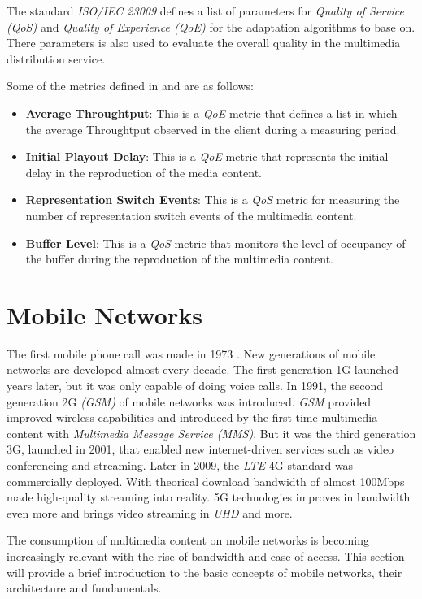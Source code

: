 The standard \textit{ISO/IEC 23009} defines a list of parameters for \textit{Quality of Service (QoS)} and
\textit{Quality of Experience (QoE)} for the adaptation algorithms to base on. There parameters 
is also used to evaluate the overall quality in the multimedia distribution service.

Some of the metrics defined in \cite{3gpp1} and \cite{ISO23009} are as follows:

\begin{itemize}
  \item \textbf{Average Throughtput}: This is a \textit{QoE} metric that defines a list in which 
  the average Throughtput observed in the client during a measuring period.
  \item \textbf{Initial Playout Delay}: This is a \textit{QoE} metric that represents the initial 
  delay in the reproduction of the media content.
  \item \textbf{Representation Switch Events}: This is a \textit{QoS} metric for measuring the 
  number of representation switch events of the multimedia content.
  \item \textbf{Buffer Level}: This is a \textit{QoS} metric that monitors the level of occupancy
  of the buffer during the reproduction of the multimedia content.
\end{itemize}


\section{Mobile Networks}
\label{sec:mobile}

The first mobile phone call was made in 1973 \cite{mob1}. New generations of mobile networks 
are developed almost every decade. The first generation 1G launched years later, but
it was only capable of doing voice calls. In 1991, the second generation 2G \textit{(GSM)} of 
mobile networks was introduced. \textit{GSM} provided improved wireless capabilities and 
introduced by the first time multimedia content with \textit{Multimedia Message Service (MMS)}.
But it was the third generation 3G, launched in 2001, that enabled new internet-driven
services such as video conferencing and streaming. Later in 2009, the \textit{LTE} 4G standard
was commercially deployed. With theorical download bandwidth of almost 100Mbps made high-quality
streaming into reality. 5G technologies improves in bandwidth even more and brings 
video streaming in \textit{UHD} and more.

The consumption of multimedia content on mobile networks is becoming increasingly relevant with 
the rise of bandwidth and ease of access. This section will provide a brief introduction to the 
basic concepts of mobile networks, their architecture and fundamentals.

